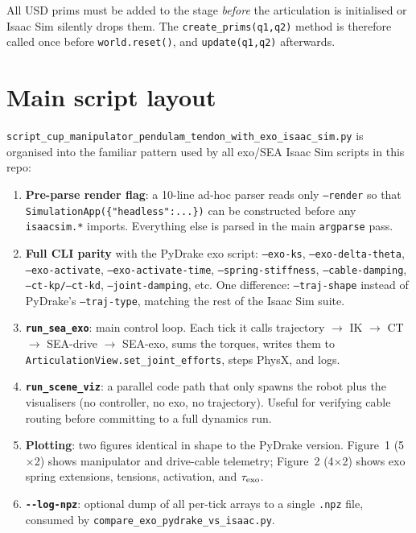 \documentclass[11pt,a4paper]{article}
\begin{document}
\begin{warnbox}
All USD prims must be added to the stage \emph{before} the articulation
is initialised or Isaac Sim silently drops them.  The
\texttt{create\_prims(q1,q2)} method is therefore called once before
\texttt{world.reset()}, and \texttt{update(q1,q2)} afterwards.
\end{warnbox}

\section{Main script layout}

\texttt{script\_cup\_manipulator\_pendulam\_tendon\_with\_exo\_isaac\_sim.py}
is organised into the familiar pattern used by all exo/SEA Isaac Sim
scripts in this repo:

\begin{enumerate}[leftmargin=2em]
    \item \textbf{Pre-parse render flag}: a 10-line ad-hoc parser
          reads only \texttt{--render} so that
          \texttt{SimulationApp(\{"headless":...\})} can be constructed
          before any \texttt{isaacsim.*} imports.  Everything else is
          parsed in the main \texttt{argparse} pass.
    \item \textbf{Full CLI parity} with the PyDrake exo script:
          \texttt{--exo-ks}, \texttt{--exo-delta-theta},
          \texttt{--exo-activate}, \texttt{--exo-activate-time},
          \texttt{--spring-stiffness}, \texttt{--cable-damping},
          \texttt{--ct-kp/--ct-kd}, \texttt{--joint-damping}, etc.
          One difference: \texttt{--traj-shape} instead of
          PyDrake's \texttt{--traj-type}, matching the rest of the
          Isaac Sim suite.
    \item \textbf{\texttt{run\_sea\_exo}}: main control loop.  Each
          tick it calls trajectory $\to$ IK $\to$ CT $\to$ SEA-drive
          $\to$ SEA-exo, sums the torques, writes them to
          \texttt{ArticulationView.set\_joint\_efforts}, steps
          PhysX, and logs.
    \item \textbf{\texttt{run\_scene\_viz}}: a parallel code path that
          only spawns the robot plus the visualisers (no controller,
          no exo, no trajectory).  Useful for verifying cable routing
          before committing to a full dynamics run.
    \item \textbf{Plotting}: two figures identical in shape to the
          PyDrake version.  Figure~1 (5$\times$2) shows manipulator
          and drive-cable telemetry; Figure~2 (4$\times$2) shows exo
          spring extensions, tensions, activation, and $\tau_{\rm exo}$.
    \item \textbf{\texttt{-{}-log-npz}}: optional dump of all per-tick
          arrays to a single \texttt{.npz} file, consumed by
          \texttt{compare\_exo\_pydrake\_vs\_isaac.py}.
\end{enumerate}
\end{document}
